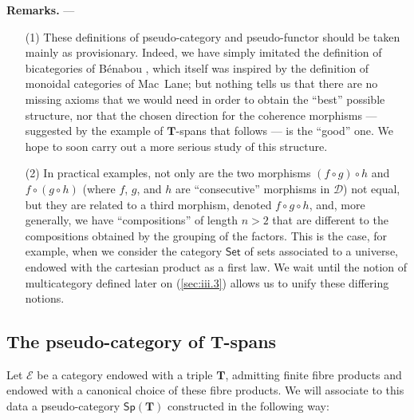 \documentclass[fleqn]{article}
\newenvironment{rmenv}[1]
  {\phantomsection\par\medskip\noindent\textbf{#1.}\rmfamily}
  {\par\medskip}
\newcommand{\oldpage}[1]{\marginpar{\footnotesize$\Big\vert$ \textit{p.~#1}}}
\newcommand{\TT}{\mathbf{T}}
\newcommand{\cat}[1]{\mathcal{#1}}
\newcommand{\Cat}[1]{\mathsf{#1}}
\newcommand{\Sp}[1]{\Cat{Sp}(#1)}
\begin{document}
\begin{rmenv}{Remarks}
  ---
  \begin{enumerate}
    \item[(1)]
      These definitions of pseudo-category and pseudo-functor should be taken mainly as provisionary.
      Indeed, we have simply imitated the definition of bicategories of Bénabou \cite{Be}, which itself was inspired by the definition of monoidal categories of Mac~Lane;
      but nothing tells us that there are no missing axioms that we would need in order to obtain the ``best'' possible structure, nor that the chosen direction for the coherence morphisms --- suggested by the example of $\TT$-spans that follows --- is the ``good'' one.
      We hope to soon carry out a more serious study of this structure.

    \item[(2)]
      In practical examples, not only are the two morphisms $(f\circ g)\circ h$ and $f\circ(g\circ h)$ (where $f$, $g$, and $h$ are ``consecutive'' morphisms in $\cat{D}$) not equal, but they are related to a third morphism, denoted $f\circ g\circ h$, and, more generally, we have ``compositions'' of length $n>2$ that are different to the compositions obtained by the grouping of the factors.
      \oldpage{248}
      This is the case, for example, when we consider the category $\Cat{Set}$ of sets associated to a universe, endowed with the cartesian product as a first law.
      We wait until the notion of multicategory defined later on (\cref{sec:iii.3}) allows us to unify these differing notions.
  \end{enumerate}
\end{rmenv}



\subsection{The pseudo-category of $\TT$-spans}
\label{sec:ii.2}

Let $\cat{E}$ be a category endowed with a triple $\TT$, admitting finite fibre products and endowed with a canonical choice of these fibre products.
We will associate to this data a pseudo-category $\Sp{\TT}$ constructed in the following way:
\end{document}
